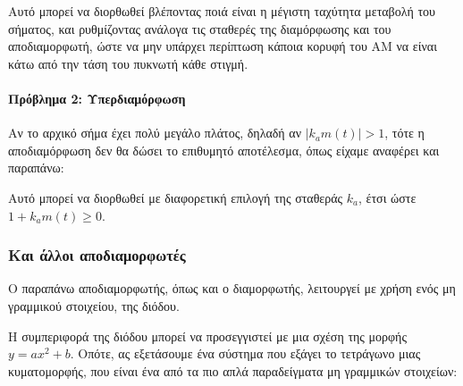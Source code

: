 \documentclass[11pt,a4paper,notitlepage,fleqn,final]{article}
\begin{document}
Αυτό μπορεί να διορθωθεί βλέποντας ποιά είναι η μέγιστη ταχύτητα μεταβολή του σήματος, και
ρυθμίζοντας ανάλογα τις σταθερές της διαμόρφωσης και του αποδιαμορφωτή, ώστε να μην υπάρχει
περίπτωση κάποια κορυφή του AM να είναι κάτω από την τάση του πυκνωτή κάθε στιγμή.

\paragraph{Πρόβλημα 2: Υπερδιαμόρφωση}

Αν το αρχικό σήμα έχει πολύ μεγάλο πλάτος, δηλαδή
αν \( \left| k_a m(t) \right| > 1 \), τότε η αποδιαμόρφωση δεν θα δώσει το επιθυμητό
αποτέλεσμα, όπως είχαμε αναφέρει και παραπάνω:


Αυτό μπορεί να διορθωθεί με διαφορετική επιλογή της σταθεράς \( k_a \), έτσι ώστε \( 1 + k_am(t) \geq 0 \).

\subsubsection{Και άλλοι αποδιαμορφωτές}
Ο παραπάνω αποδιαμορφωτής, όπως και ο διαμορφωτής, λειτουργεί με χρήση ενός μη γραμμικού
στοιχείου, της διόδου.


Η συμπεριφορά της διόδου μπορεί να προσεγγιστεί με μια σχέση της μορφής \( y= ax^2+b \).
Οπότε, ας εξετάσουμε ένα σύστημα που εξάγει το τετράγωνο μιας κυματομορφής, που είναι ένα
από τα πιο απλά παραδείγματα μη γραμμικών στοιχείων:
\end{document}
